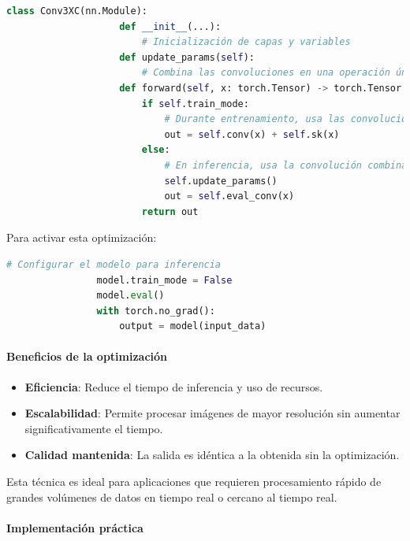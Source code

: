                 \begin{lstlisting}[language=Python]
                class Conv3XC(nn.Module):
                    def __init__(...):
                        # Inicialización de capas y variables
                    def update_params(self):
                        # Combina las convoluciones en una operación única
                    def forward(self, x: torch.Tensor) -> torch.Tensor:
                        if self.train_mode:
                            # Durante entrenamiento, usa las convoluciones originales
                            out = self.conv(x) + self.sk(x)
                        else:
                            # En inferencia, usa la convolución combinada
                            self.update_params()
                            out = self.eval_conv(x)
                        return out
                \end{lstlisting}

                Para activar esta optimización:

                \begin{lstlisting}[language=Python]
                # Configurar el modelo para inferencia
                model.train_mode = False
                model.eval()
                with torch.no_grad():
                    output = model(input_data)
                \end{lstlisting}

            \paragraph{Beneficios de la optimización}

                \begin{itemize}
                    \item \textbf{Eficiencia}: Reduce el tiempo de inferencia y uso de recursos.
                    \item \textbf{Escalabilidad}: Permite procesar imágenes de mayor resolución sin aumentar significativamente el tiempo.
                    \item \textbf{Calidad mantenida}: La salida es idéntica a la obtenida sin la optimización.
                \end{itemize}

                Esta técnica es ideal para aplicaciones que requieren procesamiento rápido de grandes volúmenes de datos en tiempo real o cercano al tiempo real.

            \paragraph{Implementación práctica}

